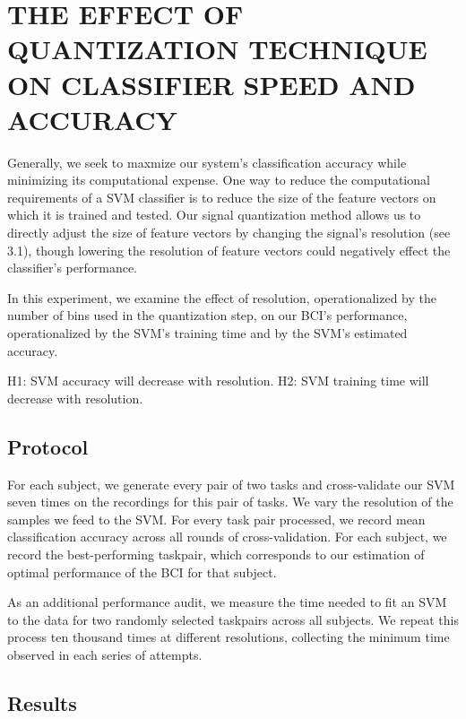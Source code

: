 \section{\uppercase{The effect of quantization technique on classifier speed and accuracy}}


Generally, we seek to maxmize our system's classification accuracy while minimizing its computational expense. One way to reduce the computational requirements of a SVM classifier is to reduce the size of the feature vectors on which it is trained and tested. Our signal quantization method allows us to directly adjust the size of feature vectors by changing the signal's resolution (see 3.1), though lowering the resolution of feature vectors could negatively effect the classifier's performance.

In this experiment, we examine the effect of resolution, operationalized by the number of bins used in the quantization step, on our BCI's performance, operationalized by the SVM's training time and by the SVM's estimated accuracy. 

H1: SVM accuracy will decrease with resolution.
H2: SVM training time will decrease with resolution.

\subsection{Protocol}

For each subject, we generate every pair of two tasks and cross-validate our SVM seven times on the recordings for this pair of tasks. We vary the resolution of the samples we feed to the SVM. For every task pair processed, we record mean classification accuracy across all rounds of cross-validation. For each subject, we record the best-performing taskpair, which corresponds to our estimation of optimal performance of the BCI for that subject.

As an additional performance audit, we measure the time needed to fit an SVM to the data for two randomly selected taskpairs across all subjects. We repeat this process ten thousand times at different resolutions, collecting the minimum time observed in each series of attempts.

\subsection{Results}

